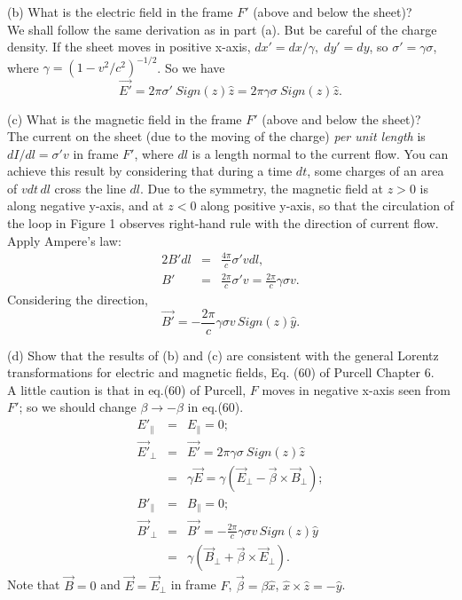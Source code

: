 \begin{enumerate}
(b) What is the electric field in the frame $F'$ (above and below the
sheet)?\\

We shall follow the same derivation as in part (a).  But be careful of
the charge density.  If the sheet moves in positive x-axis,
$dx'=dx/\gamma,\;dy'=dy$, so $\sigma'=\gamma\sigma$, where
$\gamma=(1-v^2/c^2)^{-1/2}$.  So we have
\begin{equation}
\vec{E'}=2\pi\sigma'\:Sign(z)\hat z=2\pi\gamma\sigma\:Sign(z)\hat z.
\end{equation}

(c) What is the magnetic field in the frame $F'$ (above and below the
sheet)?\\

The current on the sheet (due to the moving of the charge) {\sl per
unit length} is $dI/dl=\sigma' v$ in frame $F'$, where $dl$ is a
length normal to the current flow.  You can achieve this result by
considering that during a time $dt$, some charges of 
an area of $vdt\,dl$ cross the line $dl$.  Due to the symmetry, the
magnetic field at $z>0$ is along negative y-axis, and at $z<0$ along
positive y-axis, so that the circulation of  the loop in Figure 1 
observes right-hand rule with the direction of current flow.  Apply
Ampere's law:
\begin{eqnarray}
2B'dl&=&\frac{4\pi}{c}\sigma'vdl,\\
B'&=&\frac{2\pi}{c}\sigma' v=\frac{2\pi}{c}\gamma\sigma v.
\end{eqnarray}
Considering the direction,
\begin{equation}
\vec{B'}=-\frac{2\pi}{c}\gamma\sigma v\,Sign(z)\hat{y}.
\end{equation}

(d) Show that the results of (b) and (c) are consistent with 
the general Lorentz transformations for electric and magnetic fields, 
Eq. (60) of Purcell Chapter 6.\\

A little caution is that in eq.(60) of Purcell, $F$ moves in negative
x-axis seen from $F'$; so we should change $\beta\rightarrow -\beta$
in eq.(60).  
\begin{eqnarray}
E'_{\|}&=&E_{\|}=0;\\
\vec{E'}_{\bot}&=&\vec{E'}=2\pi\gamma\sigma\:Sign(z)\hat{z}\nonumber\\
&=&\gamma\vec{E}=\gamma(\vec{E}_{\bot}-\vec{\beta}\times\vec{B}_{\bot});\\
B'_{\|}&=&B_{\|}=0;\\
\vec{B'}_{\bot}&=&\vec{B'}= -\frac{2\pi}{c}\gamma\sigma v\,Sign(z)\hat{y}
\nonumber\\
&=& \gamma(\vec{B}_{\bot}+\vec{\beta}\times \vec{E}_{\bot}).
\end{eqnarray}
Note that $\vec{B}=0$ and $\vec{E}=\vec{E}_{\bot}$ in frame $F$, 
$\vec{\beta}=\beta\hat{x}$, $\hat{x}\times\hat{z}=-\hat{y}$.

\end{enumerate}

